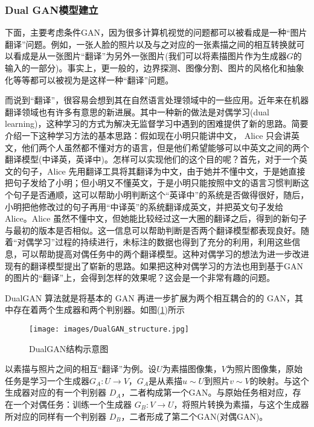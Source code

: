        \subsubsection{Dual GAN模型建立}
            \par
            下面，主要考虑条件GAN，因为很多计算机视觉的问题都可以被看成是一种“图片翻译”问题。例如，一张人脸的照片以及与之对应的一张素描之间的相互转换就可以看成是从一张图片“翻译”为另外一张图片(我们可以将素描图片作为生成器$G$的输入的一部分)。事实上，更一般的，边界探测、图像分割、图片的风格化和抽象化等等都可以被视为是这样一种“翻译”问题。
            \par
            而说到“翻译”，很容易会想到其在自然语言处理领域中的一些应用。近年来在机器翻译领域也有许多有意思的新进展。其中一种新的做法是对偶学习(dual learning)，这种学习的方式为解决无监督学习中遇到的困难提供了新的思路。简要介绍一下这种学习方法的基本思路：假如现在小明只能讲中文， Alice 只会讲英文，他们两个人虽然都不懂对方的语言，但是他们希望能够可以中英文之间的两个翻译模型(中译英，英译中)。怎样可以实现他们的这个目的呢？首先，对于一个英文的句子，Alice 先用翻译工具将其翻译为中文，由于她并不懂中文，于是她直接把句子发给了小明；但小明又不懂英文，于是小明只能按照中文的语言习惯判断这个句子是否通顺，这可以帮助小明判断这个“英译中”的系统是否做得很好，随后，小明把他修改过的句子再用“中译英”的系统翻译成英文，并把英文句子发给 Alice。Alice 虽然不懂中文，但她能比较经过这一大圈的翻译之后，得到的新句子与最初的版本是否相似。这一信息可以帮助判断是否两个翻译模型都表现良好。随着“对偶学习”过程的持续进行，未标注的数据也得到了充分的利用，利用这些信息，可以帮助提高对偶任务中的两个翻译模型。这种对偶学习的想法为进一步改进现有的翻译模型提出了崭新的思路。如果把这种对偶学习的方法也用到基于GAN的图片的“翻译”上，会得到怎样的效果呢？这会是一个非常有趣的问题。
            \par
            DualGAN 算法就是将基本的 GAN 再进一步扩展为两个相互耦合的的 GAN，其中存在着两个生成器和两个判别器。如图(\ref{fig:DualGAN结构示意图})所示
                \begin{figure}[H]
                \centering
                \texttt{[image: images/DualGAN\_structure.jpg]}
                \caption{DualGAN结构示意图}
                \label{fig:DualGAN结构示意图}
                \end{figure}
            以素描与照片之间的相互“翻译”为例。设$U$为素描图像集，$V$为照片图像集，原始任务是学习一个生成器$G_A:U\rightarrow V$，$G_A$是从素描$u\sim U$到照片$v\sim V$的映射。与这个生成器对应的有一个判别器 $D_A$，二者构成第一个GAN。与原始任务相对应，存在一个对偶任务：训练一个生成器 $G_B:V\rightarrow U$，将照片转换为素描，与这个生成器所对应的同样有一个判别器 $D_B$，二者形成了第二个GAN(对偶GAN)。
